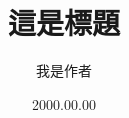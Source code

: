 \documentclass[12pt]{beamer}
\begin{document}
	\author{我是作者}
	\title{這是標題}
	\date{2000.00.00}  %
	\begin{frame}[plain]
		\maketitle
	\end{frame}
	
	\begin{frame}
		\frametitle{}
	\end{frame}
\end{document}

